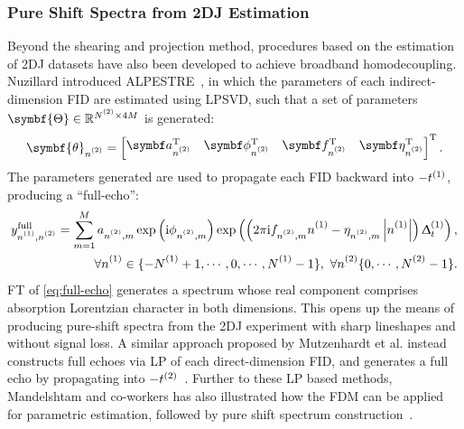 \subsubsection{Pure Shift Spectra from 2DJ Estimation}
Beyond the shearing and projection method, procedures based on the estimation
of \ac{2DJ} datasets have also been developed to achieve broadband
homodecoupling. Nuzillard introduced
\ac{ALPESTRE}~\cite{Nuzillard1996,Martinez2012}, in which the parameters of each
indirect-dimension FID are estimated using \ac{LPSVD}, such that a set of
parameters $\symbf{\Theta} \in \mathbb{R}^{\Ntwo \times 4M}$ is generated:
\begin{equation}
    \symbf{\theta}_{\ntwo} =
    \begin{bmatrix}
        \bda_{\ntwo}\T &
        \bdphi_{\ntwo}\T &
        \bdf_{\ntwo}\T &
        \bdeta_{\ntwo}\T
    \end{bmatrix}\T.
\end{equation}
The parameters generated are used to propagate each FID backward into
$-t^{(1)}$, producing a ``full-echo'':
\begin{equation}
    \begin{split}
        y^{\text{full}}_{\none,\ntwo} = \sum_{m=1}^{M}
            a_{\ntwo,m}
            \exp\left(\iu \phi_{\ntwo,m}\right)
            \exp\left(\left(2 \pi \iu f_{\ntwo,m} \none
            -\eta_{\ntwo,m}  \left\lvert \none \right\rvert \right)\Dtone\right), \\
        \forall \none \in \lbrace -\None + 1, \cdots, 0, \cdots, \None - 1 \rbrace,\ \forall \ntwo \lbrace 0, \cdots, \Ntwo - 1 \rbrace.
    \end{split}
    \label{eq:full-echo}
\end{equation}
\ac{FT} of \cref{eq:full-echo} generates a spectrum whose real component
comprises absorption
Lorentzian character in both dimensions. This opens up the means of producing
pure-shift spectra from the \ac{2DJ} experiment with sharp lineshapes and
without signal loss. A similar approach proposed by Mutzenhardt et al.
instead constructs full echoes via \ac{LP} of each direct-dimension
\ac{FID}, and generates a full echo by propagating into
$-t^{(2)}$~\cite{Mutzenhardt1999}. Further to these \ac{LP} based methods,
Mandelshtam and co-workers has also illustrated how the \ac{FDM} can be applied
for parametric estimation, followed by pure shift spectrum
construction~\cite{Mandelshtam1997,Mandelshtam1998}.

